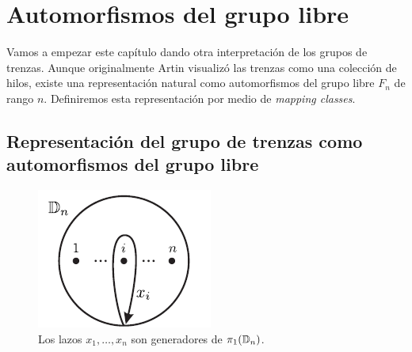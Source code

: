 \documentclass[TFG.tex]{subfiles}
\begin{document}
\chapter{Automorfismos del grupo libre}

Vamos a empezar este capítulo dando otra interpretación de los grupos de trenzas. Aunque originalmente Artin visualizó las trenzas como una colección de hilos, existe una representación natural como automorfismos del grupo libre $F_n$ de rango $n$. Definiremos esta representación por medio de \emph{mapping classes}.

\section{Representación del grupo de trenzas como automorfismos del grupo libre}

\begin{figure}[h!]
\includegraphics[scale=0.7]{Imagenes/Disco.png}
\caption{Los lazos $x_1,\dots,x_n$ son generadores de $\pi_1(\mathbb{D}_n)$.}\label{disco}
\end{figure}
\end{document}
